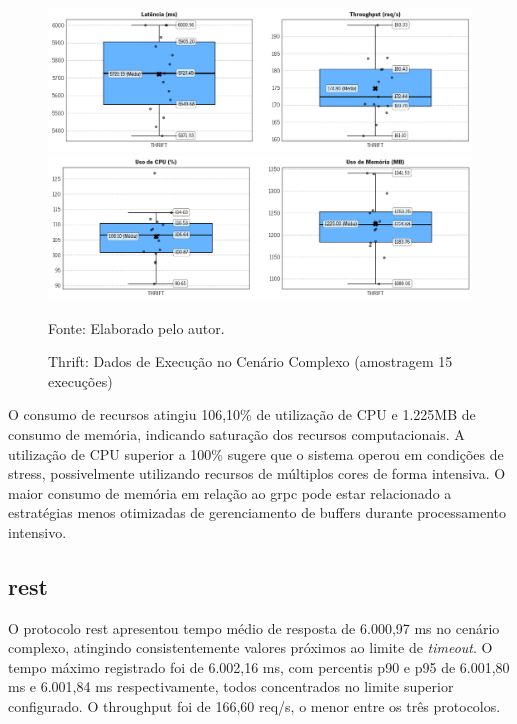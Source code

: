 \begin{figure}[H]
    \caption{Thrift: Dados de Execução no Cenário Complexo (amostragem 15 execuções)}
    \label{fig:5-Complexo-Thrift-k6}
    \centering
    \includegraphics[width=1\linewidth]{imagens//resultados/5-resultados-Complexo-Thrift-k6.png}
    \includegraphics[width=1\linewidth]{imagens//resultados/5-resultados-Complexo-Thrift-prometheus.png}    
    {\par \raggedright \footnotesize Fonte: Elaborado pelo autor.\par}
\end{figure}


O consumo de recursos atingiu 106,10\% de utilização de CPU e 1.225MB de consumo de memória, indicando saturação dos recursos computacionais. A utilização de CPU superior a 100\% sugere que o sistema operou em condições de stress, possivelmente utilizando recursos de múltiplos cores de forma intensiva. O maior consumo de memória em relação ao \gls{grpc} pode estar relacionado a estratégias menos otimizadas de gerenciamento de buffers durante processamento intensivo.

\subsection{\gls{rest}}

O protocolo \gls{rest} apresentou tempo médio de resposta de 6.000,97 ms no cenário complexo, atingindo consistentemente valores próximos ao limite de \textit{timeout}. O tempo máximo registrado foi de 6.002,16 ms, com percentis p90 e p95 de 6.001,80 ms e 6.001,84 ms respectivamente, todos concentrados no limite superior configurado. O throughput foi de 166,60 req/s, o menor entre os três protocolos.


